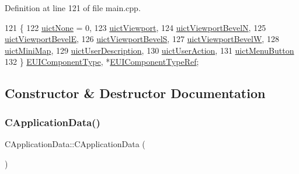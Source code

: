 Definition at line 121 of file main.\+cpp.


\begin{DoxyCode}
121                     \{
122             \hyperlink{classCApplicationData_ad49585591fc53bff1c89bc512170280da21bc83c610f1f8b1d686aed22d343f93}{uictNone} = 0,
123             \hyperlink{classCApplicationData_ad49585591fc53bff1c89bc512170280da07aa98dbeb8cfb8ba9cdbc06279732f2}{uictViewport},
124             \hyperlink{classCApplicationData_ad49585591fc53bff1c89bc512170280dacf49c7c3f42e286ec4f50e5801d8124b}{uictViewportBevelN},
125             \hyperlink{classCApplicationData_ad49585591fc53bff1c89bc512170280da141b8531beff649b3c5f1878913998bf}{uictViewportBevelE},
126             \hyperlink{classCApplicationData_ad49585591fc53bff1c89bc512170280dad008dbb58e954eec23792a7ef4f72200}{uictViewportBevelS},
127             \hyperlink{classCApplicationData_ad49585591fc53bff1c89bc512170280da199c7a8543278dfb4d9f53ab0b43ce6e}{uictViewportBevelW},
128             \hyperlink{classCApplicationData_ad49585591fc53bff1c89bc512170280dad6b8ace13bcd10900856e550d608bc1d}{uictMiniMap},
129             \hyperlink{classCApplicationData_ad49585591fc53bff1c89bc512170280dab72119ded1111e10add2cb44e6a32c9e}{uictUserDescription},
130             \hyperlink{classCApplicationData_ad49585591fc53bff1c89bc512170280da9b2752db122b319f942c3b69c2accfab}{uictUserAction},
131             \hyperlink{classCApplicationData_ad49585591fc53bff1c89bc512170280da8323c73a1745d4b4e6e469088041f264}{uictMenuButton}
132         \} \hyperlink{classCApplicationData_ad49585591fc53bff1c89bc512170280d}{EUIComponentType}, *\hyperlink{classCApplicationData_a117c7e1886e2db3be85388b120ad1d34}{EUIComponentTypeRef};
\end{DoxyCode}


\subsection{Constructor \& Destructor Documentation}
\hypertarget{classCApplicationData_a3d496acbdfac67ca25ee028d0703c492}{}\label{classCApplicationData_a3d496acbdfac67ca25ee028d0703c492} 
\subsubsection{\texorpdfstring{C\+Application\+Data()}{CApplicationData()}}
{\footnotesize\ttfamily C\+Application\+Data\+::\+C\+Application\+Data (\begin{DoxyParamCaption}{ }\end{DoxyParamCaption})}



